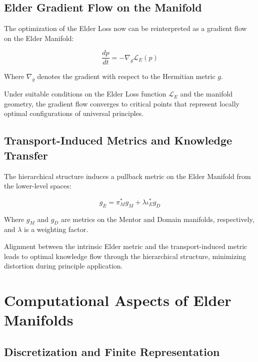 \subsection{Elder Gradient Flow on the Manifold}

The optimization of the Elder Loss now can be reinterpreted as a gradient flow on the Elder Manifold:

\begin{equation}
\frac{dp}{dt} = -\nabla_g \mathcal{L}_E(p)
\end{equation}

Where $\nabla_g$ denotes the gradient with respect to the Hermitian metric $g$.

\begin{proposition}
Under suitable conditions on the Elder Loss function $\mathcal{L}_E$ and the manifold geometry, the gradient flow converges to critical points that represent locally optimal configurations of universal principles.
\end{proposition}

\subsection{Transport-Induced Metrics and Knowledge Transfer}

The hierarchical structure induces a pullback metric on the Elder Manifold from the lower-level spaces:

\begin{equation}
g_E = \pi_M^* g_M + \lambda \iota_E^* g_D
\end{equation}

Where $g_M$ and $g_D$ are metrics on the Mentor and Domain manifolds, respectively, and $\lambda$ is a weighting factor.

\begin{theorem}
Alignment between the intrinsic Elder metric and the transport-induced metric leads to optimal knowledge flow through the hierarchical structure, minimizing distortion during principle application.
\end{theorem}

\section{Computational Aspects of Elder Manifolds}

\subsection{Discretization and Finite Representation}

